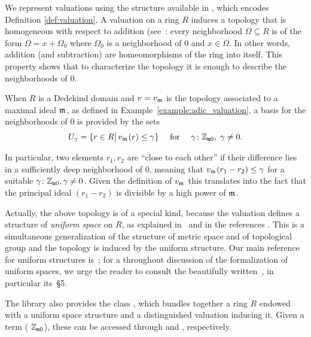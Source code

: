 \documentclass[sigplan,10pt,anonymous,review]{acmart}
\begin{document}
We represent valuations using the \href{https://leanprover-community.github.io/mathlib_docs/ring_theory/valuation/basic.html#valuation}{\extlink} structure
available in \mathlib, which encodes Definition \ref{def:valuation}. A valuation on a ring $R$ induces a topology that is homogeneous with respect to addition (see~\cite[Chapitre~III,\S1]{Bou71}: every neighborhood $\Omega\subseteq R$ is of the form $\Omega=x+\Omega_0$ where $\Omega_0$ is a neighborhood of $0$ and $x\in\Omega$. In other words, addition (and subtraction) are homeomorphisms of the ring into itself. This property shows that to characterize the topology it is enough to describe the neighborhoods of $0$.
 
 When $R$ is a Dedekind domain and $v=v_{\maxid[\empty]}$ is the topology associated to a maximal ideal $\maxid[\empty]$, as defined in Example~\ref{example:adic_valuation}, 
 a basis for the neighborhoods of $0$ is provided by the sets
 \[
 U_\gamma = \{r \in R \big\vert\,v_{\maxid[\empty]}(r)\leq \gamma\}\quad\text{ for }\quad\gamma \colon \wzmZZ,\; \gamma \ne 0.
 \]

 In particular, two elements $r_1,r_2$ are ``close to each other'' %
 if their difference lies in a sufficiently deep neighborhood of $0$, meaning that $v_{\maxid[\empty]}(r_1-r_2)\leq \gamma$ for a suitable $ \gamma \colon \mathbb{Z}_{\mathtt{m}0}, \gamma \ne 0$. Given the definition of $v_{\maxid[\empty]}$ this translates into the fact that the principal ideal $(r_1-r_2)$ is divisible by a high power of $\maxid[\empty]$.

Actually, the above topology is of a special kind, because the valuation defines a structure of \emph{uniform space} on $R$, as explained in~\cite[Chapitre~VI, \S5]{Bou85} and in the references \ibid. This is a simultaneous generalization of the structure of metric space and of topological group and the topology is induced by the uniform structure. Our main reference for uniform structures is~\cite[Chapitre~II]{Bou71}; for a throughout discussion of the formalization of uniform spaces, we urge the reader to consult the  beautifully written~\cite{BuzComMas20}, in particular its~\S5.
 
The \mathlib library also provides the class \href{https://leanprover-community.github.io/mathlib_docs/topology/algebra/valuation.html#valued}{\extlink}, which bundles together a ring $R$ endowed with a uniform space structure and a distinguished valuation inducing it. Given a term  ( $\mathbb{Z}_{\mathtt{m}0}$), these can be accessed through  and , respectively.
\end{document}
